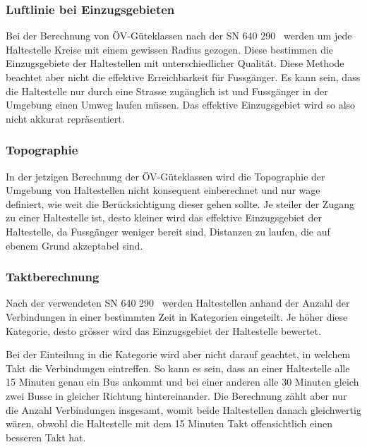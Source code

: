 \subsubsection{Luftlinie bei Einzugsgebieten}
\label{Problemstellung:Luftlinie bei Einzugsgebieten}

Bei der Berechnung von \acs{ÖV}-Güteklassen nach der \acs{SN} 640 290~\cite{sn640290} werden um jede Haltestelle Kreise mit einem gewissen Radius gezogen.
Diese bestimmen die Einzugsgebiete der Haltestellen mit unterschiedlicher Qualität.
Diese Methode beachtet aber nicht die effektive Erreichbarkeit für Fussgänger.
Es kann sein, dass die Haltestelle nur durch eine Strasse zugänglich ist und Fussgänger in der Umgebung einen Umweg laufen müssen.
Das effektive Einzugsgebiet wird so also nicht akkurat repräsentiert.

\subsubsection{Topographie}
\label{Problemstellung:Topographie}

In der jetzigen Berechnung der \acs{ÖV}-Güteklassen wird die Topographie der Umgebung von Haltestellen nicht konsequent einberechnet und nur wage definiert, wie weit die Berücksichtigung dieser gehen sollte.
Je steiler der Zugang zu einer Haltestelle ist, desto kleiner wird das effektive Einzugsgebiet der Haltestelle, da Fussgänger weniger bereit sind, Distanzen zu laufen, die auf ebenem Grund akzeptabel sind.

\subsubsection{Taktberechnung}
\label{Problemstellung:Taktberechnung}

Nach der verwendeten \acs{SN} 640 290~\cite{sn640290} werden Haltestellen anhand der Anzahl der Verbindungen in einer bestimmten Zeit in Kategorien eingeteilt.
Je höher diese Kategorie, desto grösser wird das Einzugsgebiet der Haltestelle bewertet.

Bei der Einteilung in die Kategorie wird aber nicht darauf geachtet, in welchem Takt die Verbindungen eintreffen.
So kann es sein, dass an einer Haltestelle alle 15 Minuten genau ein Bus ankommt und bei einer anderen alle 30 Minuten gleich zwei Busse in gleicher Richtung hintereinander.
Die Berechnung zählt aber nur die Anzahl Verbindungen insgesamt, womit beide Haltestellen danach gleichwertig wären, obwohl die Haltestelle mit dem 15 Minuten Takt offensichtlich einen besseren Takt hat.

